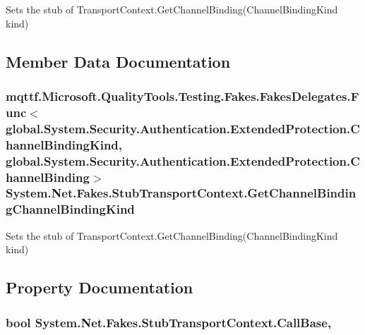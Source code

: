 Sets the stub of Transport\-Context.\-Get\-Channel\-Binding(\-Channel\-Binding\-Kind kind)



\subsection{Member Data Documentation}
\hypertarget{class_system_1_1_net_1_1_fakes_1_1_stub_transport_context_a5afe278712d173b668e7cd0c46d883b3}{
\subsubsection[{Get\-Channel\-Binding\-Channel\-Binding\-Kind}]{\setlength{\rightskip}{0pt plus 5cm}mqttf.\-Microsoft.\-Quality\-Tools.\-Testing.\-Fakes.\-Fakes\-Delegates.\-Func$<$global.\-System.\-Security.\-Authentication.\-Extended\-Protection.\-Channel\-Binding\-Kind, global.\-System.\-Security.\-Authentication.\-Extended\-Protection.\-Channel\-Binding$>$ System.\-Net.\-Fakes.\-Stub\-Transport\-Context.\-Get\-Channel\-Binding\-Channel\-Binding\-Kind}}\label{class_system_1_1_net_1_1_fakes_1_1_stub_transport_context_a5afe278712d173b668e7cd0c46d883b3}


Sets the stub of Transport\-Context.\-Get\-Channel\-Binding(\-Channel\-Binding\-Kind kind)



\subsection{Property Documentation}
\hypertarget{class_system_1_1_net_1_1_fakes_1_1_stub_transport_context_add4463a74100c17138e6cd8cf83677e6}{
\subsubsection[{Call\-Base}]{\setlength{\rightskip}{0pt plus 5cm}bool System.\-Net.\-Fakes.\-Stub\-Transport\-Context.\-Call\-Base\hspace{0.3cm}{\ttfamily [get]}, {\ttfamily [set]}}}\label{class_system_1_1_net_1_1_fakes_1_1_stub_transport_context_add4463a74100c17138e6cd8cf83677e6}


